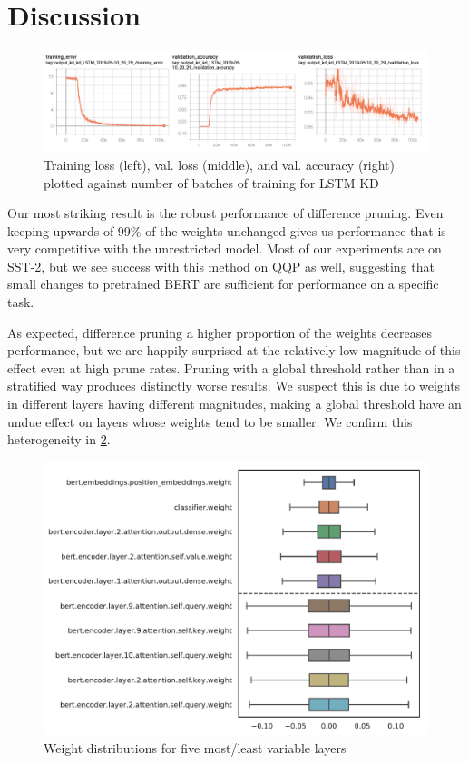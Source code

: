 \documentclass[10pt]{article}
\begin{document}




\section{Discussion}


\begin{figure}[htb]
\centering
\includegraphics[width=\textwidth]{../figs/kd_lstm_training.png}
\caption{Training loss (left), val. loss (middle), and val. accuracy
(right) plotted against number of batches of training for LSTM KD}
\label{fig:kdlstmloss}
\end{figure}

Our most striking result is the robust performance of difference pruning. Even
keeping upwards of 99\% of the weights unchanged gives us performance that is
very competitive with the unrestricted model. Most of our experiments are on
SST-2, but we see success with this method on QQP as well, suggesting that
small changes to pretrained BERT are sufficient for performance on a specific
task. 

As expected, difference pruning a higher proportion of the weights decreases
performance, but we are happily surprised at the relatively low magnitude of
this effect even at high prune rates. Pruning with a global threshold rather
than in a stratified way produces distinctly worse results. We suspect this is
due to weights in different layers having different magnitudes, making a global
threshold have an undue effect on layers whose weights tend to be smaller. We
confirm this heterogeneity in \cref{fig:weightsbylayer}.

\begin{figure}[htb]
\centering
\includegraphics[width=.5\textwidth]{../figs/value_by_layer.pdf}
\caption{Weight distributions for five most/least variable layers}
\label{fig:weightsbylayer}
\end{figure}
\end{document}
